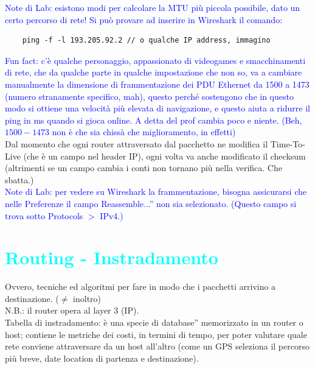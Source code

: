 \noindent\textcolor{Blue}{Note di Lab: esistono modi per calcolare la MTU più piccola possibile, dato un certo percorso di rete! Si può provare ad inserire in Wireshark il comando:}
\begin{verbatim}
    ping -f -l 193.205.92.2 // o qualche IP address, immagino
\end{verbatim}

\noindent\textcolor{Blue}{Fun fact: c'è qualche personaggio, appassionato di videogames e smacchinamenti di rete, che da qualche parte in qualche impostazione che non so, va a cambiare manualmente la dimensione di frammentazione dei PDU Ethernet da 1500 a 1473 (numero stranamente specifico, mah), questo perché sostengono che in questo modo si ottiene una velocità più elevata di navigazione, e questo aiuta a ridurre il ping in ms quando si gioca online. A detta del prof cambia poco e niente. (Beh, $1500-1473$ non è che sia chissà che miglioramento, in effetti)}\\

\noindent Dal momento che ogni router attraversato dal pacchetto ne modifica il Time-To-Live (che è un campo nel header IP), ogni volta va anche modificato il checksum (altrimenti se un campo cambia i conti non tornano più nella verifica. Che sbatta.)\\

\noindent\textcolor{Blue}{Note di Lab: per vedere su Wireshark la frammentazione, bisogna assicurarsi che nelle Preferenze il campo \openapex Reassemble...'' non sia selezionato. (Questo campo si trova sotto Protocols $>$ IPv4.)}\\

\section*{\textcolor{Cyan}{Routing - Instradamento}}
\noindent Ovvero, tecniche ed algoritmi per fare in modo che i pacchetti arrivino a destinazione. ($\neq$ inoltro)\\N.B.: il router opera al layer 3 (IP).\\

\noindent Tabella di instradamento: è una specie di \openapex database'' memorizzato in un router o host; contiene le metriche dei costi, in termini di tempo, per poter valutare quale rete conviene attraversare da un host all'altro (come un GPS seleziona il percorso più breve, date location di partenza e destinazione).\\

